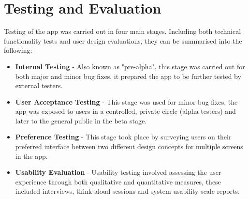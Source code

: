 \chapter{Testing and Evaluation}
Testing of the app was carried out in four main stages. Including both technical functionality tests and user design evaluations, they can be summarised into the following:
\begin{itemize}
    \item \textbf{Internal Testing} - Also known as "pre-alpha", this stage was carried out for both major and minor bug fixes, it prepared the app to be further tested by external testers.
    \item \textbf{User Acceptance Testing} - This stage was used for minor bug fixes, the app was exposed to users in a controlled, private circle (alpha testers) and later to the general public in the beta stage.
    \item \textbf{Preference Testing} - This stage took place by surveying users on their preferred interface between two different design concepts for multiple screens in the app.
    \item \textbf{Usability Evaluation} - Usability testing involved assessing the user experience through both qualitative and quantitative measures, these included interviews, think-aloud sessions and system usability scale reports.
\end{itemize}

